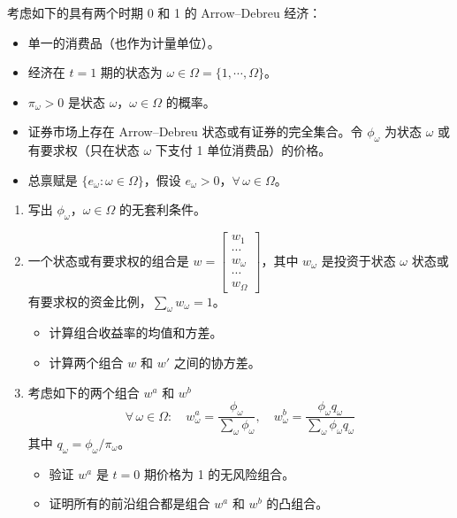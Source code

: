 \par\noindent\begin{minipage}{\linewidth}
\begin{problem}
 考虑如下的具有两个时期 0 和 1 的 Arrow--Debreu 经济：
\begin{itemize}
    \item 单一的消费品（也作为计量单位）。
    \item 经济在 $t=1$ 期的状态为 $\omega\in\Omega=\{1,\cdots,\Omega\}$。
    \item $\pi_{\omega}>0$ 是状态 $\omega$，$\omega\in\Omega$ 的概率。
    \item 证券市场上存在 Arrow--Debreu 状态或有证券的完全集合。令 $\phi_{\omega}$ 为状态 $\omega$ 或有要求权（只在状态 $\omega$ 下支付 1 单位消费品）的价格。
    \item 总禀赋是 $\{e_{\omega}:\omega\in\Omega\}$，假设 $e_{\omega}>0$，$\forall\,\omega\in\Omega$。
\end{itemize}
\begin{enumerate}[label=(\alph*)]
    \item 写出 $\phi_{\omega}$，$\omega\in\Omega$ 的无套利条件。
    \item 一个状态或有要求权的组合是 $w=\begin{bmatrix}w_{1} \\ \cdots \\ w_{\omega} \\ \cdots \\ w_{\Omega}\end{bmatrix}$，其中 $w_{\omega}$ 是投资于状态 $\omega$ 状态或有要求权的资金比例，$\sum_{\omega}w_{\omega}=1$。
    \begin{itemize}
        \item 计算组合收益率的均值和方差。
        \item 计算两个组合 $w$ 和 $w'$ 之间的协方差。
    \end{itemize}
    \item 考虑如下的两个组合 $w^{a}$ 和 $w^{b}$
    \[
        \forall\,\omega\in\Omega:\quad w_{\omega}^{a}=\frac{\phi_{\omega}}{\sum_{\omega}\phi_{\omega}},\quad w_{\omega}^{b}=\frac{\phi_{\omega}q_{\omega}}{\sum_{\omega}\phi_{\omega}q_{\omega}}
    \]
    其中 $q_{\omega}=\phi_{\omega}/\pi_{\omega}$。
    \begin{itemize}
        \item 验证 $w^{a}$ 是 $t=0$ 期价格为 1 的无风险组合。
        \item 证明所有的前沿组合都是组合 $w^{a}$ 和 $w^{b}$ 的凸组合。
    \end{itemize}
\end{enumerate}
\end{problem}
\end{minipage}\par
